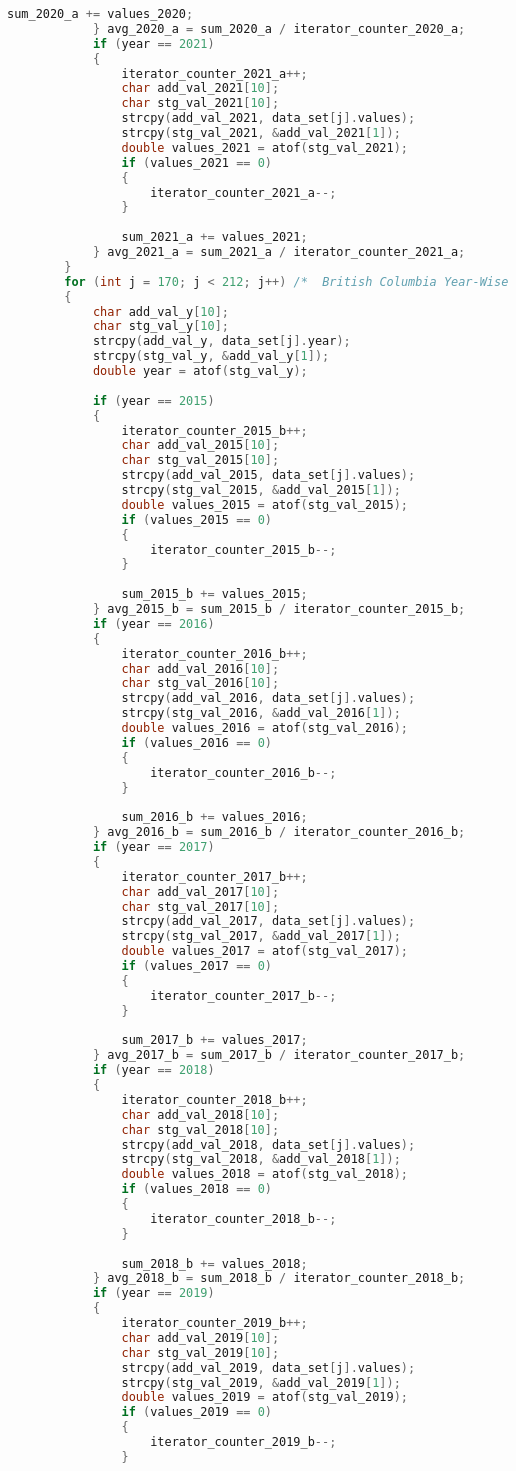 \begin{lstlisting}[language=C, caption=\textit{CPS 188 Term Project Source Code}]
				sum_2020_a += values_2020;
			} avg_2020_a = sum_2020_a / iterator_counter_2020_a;
			if (year == 2021)
			{
				iterator_counter_2021_a++;
				char add_val_2021[10];
				char stg_val_2021[10];
				strcpy(add_val_2021, data_set[j].values);
				strcpy(stg_val_2021, &add_val_2021[1]);
				double values_2021 = atof(stg_val_2021);
				if (values_2021 == 0)
				{
					iterator_counter_2021_a--;
				}
				
				sum_2021_a += values_2021;
			} avg_2021_a = sum_2021_a / iterator_counter_2021_a;
		}
		for (int j = 170; j < 212; j++)	/*	British Columbia Year-Wise Average Calculator	*/
		{
			char add_val_y[10];
			char stg_val_y[10];
			strcpy(add_val_y, data_set[j].year);
			strcpy(stg_val_y, &add_val_y[1]);
			double year = atof(stg_val_y);
			
			if (year == 2015)
			{
				iterator_counter_2015_b++;
				char add_val_2015[10];
				char stg_val_2015[10];
				strcpy(add_val_2015, data_set[j].values);
				strcpy(stg_val_2015, &add_val_2015[1]);
				double values_2015 = atof(stg_val_2015);
				if (values_2015 == 0)
				{
					iterator_counter_2015_b--;
				}
				
				sum_2015_b += values_2015;
			} avg_2015_b = sum_2015_b / iterator_counter_2015_b;
			if (year == 2016)
			{
				iterator_counter_2016_b++;
				char add_val_2016[10];
				char stg_val_2016[10];
				strcpy(add_val_2016, data_set[j].values);
				strcpy(stg_val_2016, &add_val_2016[1]);
				double values_2016 = atof(stg_val_2016);
				if (values_2016 == 0)
				{
					iterator_counter_2016_b--;
				}
				
				sum_2016_b += values_2016;
			} avg_2016_b = sum_2016_b / iterator_counter_2016_b;
			if (year == 2017)
			{
				iterator_counter_2017_b++;
				char add_val_2017[10];
				char stg_val_2017[10];
				strcpy(add_val_2017, data_set[j].values);
				strcpy(stg_val_2017, &add_val_2017[1]);
				double values_2017 = atof(stg_val_2017);
				if (values_2017 == 0)
				{
					iterator_counter_2017_b--;
				}
				
				sum_2017_b += values_2017;
			} avg_2017_b = sum_2017_b / iterator_counter_2017_b;
			if (year == 2018)
			{
				iterator_counter_2018_b++;
				char add_val_2018[10];
				char stg_val_2018[10];
				strcpy(add_val_2018, data_set[j].values);
				strcpy(stg_val_2018, &add_val_2018[1]);
				double values_2018 = atof(stg_val_2018);
				if (values_2018 == 0)
				{
					iterator_counter_2018_b--;
				}
				
				sum_2018_b += values_2018;
			} avg_2018_b = sum_2018_b / iterator_counter_2018_b;
			if (year == 2019)
			{
				iterator_counter_2019_b++;
				char add_val_2019[10];
				char stg_val_2019[10];
				strcpy(add_val_2019, data_set[j].values);
				strcpy(stg_val_2019, &add_val_2019[1]);
				double values_2019 = atof(stg_val_2019);
				if (values_2019 == 0)
				{
					iterator_counter_2019_b--;
				}
				

\end{lstlisting}
